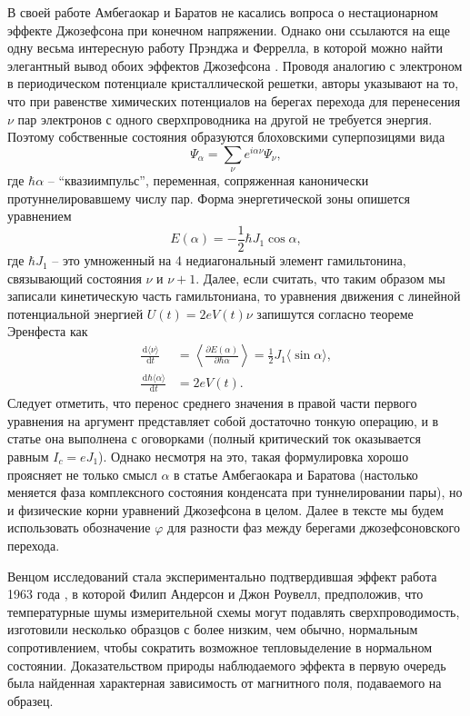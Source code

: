 \documentclass[14pt, a4paper]{extreport}
\newcommand{\diff}{\,\mathrm{d}}
\numberwithin{equation}{section}
\begin{document}
В своей работе Амбегаокар и Баратов не касались вопроса о нестационарном эффекте Джозефсона при конечном напряжении. Однако они ссылаются на еще одну весьма интересную работу Прэнджа и Феррелла, в которой можно найти элегантный вывод обоих эффектов Джозефсона \cite{ferrell1963self}. Проводя аналогию с электроном в периодическом потенциале кристаллической решетки, авторы указывают на то, что при равенстве химических потенциалов на берегах перехода для перенесения $\nu$ пар электронов с одного сверхпроводника на другой не требуется энергия. Поэтому собственные состояния образуются блоховскими суперпозицями вида
\begin{equation}
	\Psi_\alpha = \sum_\nu e^{i\alpha \nu} \Psi_\nu,
\end{equation}
где $\hbar\alpha$ -- ``квазиимпульс'', переменная, сопряженная канонически протуннелировавшему числу пар. Форма энергетической зоны опишется уравнением
\begin{equation}
	E(\alpha) = -\frac{1}{2}\hbar J_1 \cos \alpha,
\end{equation} 
где $\hbar J_1$ -- это умноженный на 4 недиагональный элемент гамильтонина, связывающий состояния $\nu$ и $\nu+1$. Далее, если считать, что таким образом мы записали кинетическую часть гамильтониана, то уравнения движения с линейной потенциальной энергией $U(t) = 2eV(t)\nu$ запишутся согласно теореме Эренфеста как 
\begin{align}
	\frac{\diff \langle \nu \rangle }{\diff t} &=\left\langle \frac{\partial E(\alpha)}{ \partial \hbar\alpha}\right\rangle = \frac{1}{2} J_1 \langle \sin \alpha \rangle,\\
	\frac{\diff \hbar\langle  \alpha \rangle}{\diff t} &= 2 e V(t).\label{eq:JJ2}
\end{align}
Следует отметить, что перенос среднего значения в правой части первого уравнения на аргумент представляет собой достаточно тонкую операцию, и в статье она выполнена с оговорками (полный критический ток оказывается равным $I_c = e J_1$). Однако несмотря на это, такая формулировка хорошо проясняет не только смысл $\alpha$ в статье Амбегаокара и Баратова (настолько меняется фаза комплексного состояния конденсата при туннелировании пары), но и физические корни уравнений Джозефсона в целом. Далее в тексте мы будем использовать обозначение $\varphi$ для разности фаз между берегами джозефсоновского перехода.

Венцом исследований стала экспериментально подтвердившая эффект работа 1963 года \cite{anderson1963probable}, в которой Филип Андерсон и Джон Роувелл, предположив, что температурные шумы измерительной схемы могут подавлять сверхпроводимость, изготовили несколько образцов с более низким, чем обычно, нормальным сопротивлением, чтобы сократить возможное тепловыделение в нормальном состоянии. Доказательством природы наблюдаемого эффекта в первую очередь была найденная характерная зависимость от магнитного поля, подаваемого на образец.
\end{document}
